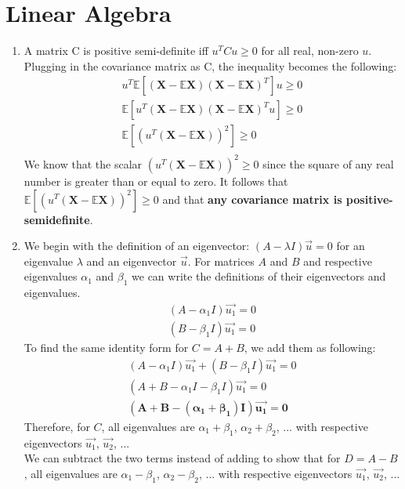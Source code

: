 \documentclass[12pt]{article}
\begin{document}
\section{Linear Algebra}
\begin{enumerate}[label=\alph*.]
    \item A matrix C is positive semi-definite iff \( u^TCu \geq 0 \) for all real, non-zero \(u\). Plugging in the covariance matrix as C, the inequality becomes the following:
    	\begin{gather*}
	    u^T\mathbb{E}[(\mathbf{X} - \mathbb{E}\mathbf{X})(\mathbf{X} - \mathbb{E}\mathbf{X})^T]u \geq 0 \\
	    \mathbb{E}[u^T(\mathbf{X} - \mathbb{E}\mathbf{X})(\mathbf{X} - \mathbb{E}\mathbf{X})^Tu] \geq 0 \\
	    \mathbb{E}[(u^T(\mathbf{X} - \mathbb{E}\mathbf{X}))^2] \geq 0 \\
	\end{gather*}
	We know that the scalar \( (u^T(\mathbf{X} - \mathbb{E}\mathbf{X}))^2 \geq 0 \) since the square of any real number is greater than or equal to zero. It follows that \( \mathbb{E}[(u^T(\mathbf{X} - \mathbb{E}\mathbf{X}))^2] \geq 0 \) and that \textbf{any covariance matrix is positive-semidefinite}.
    \item We begin with the definition of an eigenvector: \( (A - \lambda I)\vec{u} = 0 \) for an eigenvalue \(\lambda\) and an eigenvector \(\vec{u}\). For matrices \(A\) and \(B\) and respective eigenvalues \(\alpha_1\) and \(\beta_1\) we can write the definitions of their eigenvectors and eigenvalues.
	\begin{gather*}
	    (A - \alpha_1 I)\vec{u_1} = 0 \\
	    (B - \beta_1 I)\vec{u_1} = 0 
	\end{gather*}
    To find the same identity form for \( C = A + B \), we add them as following:
	\begin{gather*}
	    (A - \alpha_1 I)\vec{u_1} + (B - \beta_1 I)\vec{u_1}  = 0 \\
	    (A + B - \alpha_1 I - \beta_1 I)\vec{u_1} = 0 \\
	    \mathbf{(A + B - (\alpha_1 + \beta_1) I)\vec{u_1} = 0}
	\end{gather*}
    Therefore, for \(C\), all eigenvalues are \(\alpha_1 + \beta_1\), \(\alpha_2 + \beta_2\), ... with respective eigenvectors \(\vec{u_1}\), \(\vec{u_2}\), ... \\
    We can subtract the two terms instead of adding to show that for \( D = A - B \), all eigenvalues are \(\alpha_1 - \beta_1\), \(\alpha_2 - \beta_2\), ... with respective eigenvectors \(\vec{u_1}\), \(\vec{u_2}\), ...

\end{enumerate}
\end{document}
